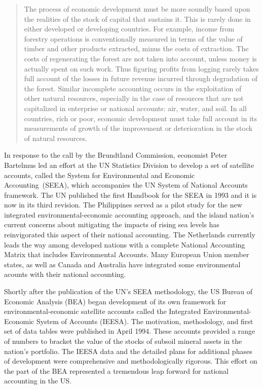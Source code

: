 \begin{quote}
	The process of economic development must be more soundly 
	based upon the realities of the stock of capital that sustains it. 
	This is rarely done in either developed or developing countries. 
	For example, income from forestry operations is conventionally measured 
	in terms of the value of timber and other products extracted, 
	minus the costs of extraction. 
	The costs of regenerating the forest are not taken into account, 
	unless money is actually spent on such work. 
	Thus figuring profits from logging rarely takes full account 
	of the losses in future revenue incurred through degradation of the forest. 
	Similar incomplete accounting occurs in the exploitation 
	of other natural resources, 
	especially in the case of resources that are not capitalized 
	in enterprise or national accounts: air, water, and soil. 
	In all countries, rich or poor, 
	economic development must take full account 
	in its measurements of growth of the improvement or 
	deterioration in the stock 
	of natural resources.\cite[Chapter~2, Paragraph~36]{brundtland1987}
\end{quote}

In response to the call by the Brundtland Commission, 
economist Peter Bartelmus led an effort at the UN Statistics Division 
to develop a set of satellite accounts, 
called the System for Environmental and Economic Accounting~(SEEA),
which accompanies the UN System of National Accounts framework.\cite{bartelmus_integrated_1991}
The UN published the first Handbook for the SEEA in 1993 and it is now in 
its third revision.\cite{UNSEEA1993} 
The Philippines served as a pilot study for the new integrated environmental-economic
accounting approach, and the island nation's current concerns about mitigating the impacts of 
rising sea levels has reinvigorated this aspect 
of their national accounting.\cite{uno1998, PhilippinesSEEAWeb}
The Netherlands currently leads the way 
among developed nations with a complete  National Accounting Matrix that 
includes Environmental Accounts.\cite{DutchStats2009}
Many European Union member states, 
as well as Canada and Australia have integrated 
some environmental acounts with their national accounting.\cite{UNSEEAWeb} 

Shortly after the publication 
of the UN's SEEA methodology,
the US Bureau of Economic Analysis (BEA) began development of its own
framework for environmental-economic satellite accounts called the 
Integrated Environmental-Economic System of Accounts (IEESA). 
The motivation, methodology, and first set of data tables were published 
in April 1994.\cite{BEA1994a} 
These accounts provided a range of numbers to bracket the value
of the stocks of subsoil mineral assets in the nation's portfolio. 
The IEESA data and the detailed plans for additional phases 
of development were comprehensive and methodologically rigorous. 
This effort on the part of the BEA
represented a tremendous leap forward for 
national accounting in the US.

